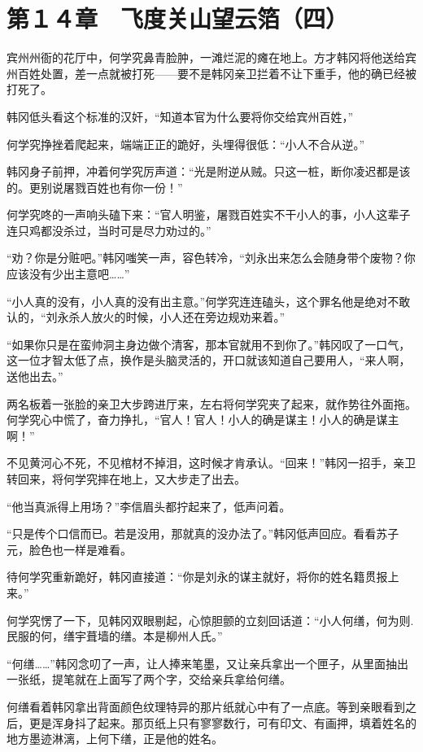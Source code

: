 \section{第１４章　飞度关山望云箔（四）}

宾州州衙的花厅中，何学究鼻青脸肿，一滩烂泥的瘫在地上。方才韩冈将他送给宾州百姓处置，差一点就被打死——要不是韩冈亲卫拦着不让下重手，他的确已经被打死了。

韩冈低头看这个标准的汉奸，“知道本官为什么要将你交给宾州百姓，”

何学究挣挫着爬起来，端端正正的跪好，头埋得很低：“小人不合从逆。”

韩冈身子前押，冲着何学究厉声道：“光是附逆从贼。只这一桩，断你凌迟都是该的。更别说屠戮百姓也有你一份！”

何学究咚的一声响头磕下来：“官人明鉴，屠戮百姓实不干小人的事，小人这辈子连只鸡都没杀过，当时可是尽力劝过的。”

“劝？你是分赃吧。”韩冈嗤笑一声，容色转冷，“刘永出来怎么会随身带个废物？你应该没有少出主意吧……”

“小人真的没有，小人真的没有出主意。”何学究连连磕头，这个罪名他是绝对不敢认的，“刘永杀人放火的时候，小人还在旁边规劝来着。”

“如果你只是在蛮帅洞主身边做个清客，那本官就用不到你了。”韩冈叹了一口气，这一位才智太低了点，换作是头脑灵活的，开口就该知道自己要用人，“来人啊，送他出去。”

两名板着一张脸的亲卫大步跨进厅来，左右将何学究夹了起来，就作势往外面拖。何学究心中慌了，奋力挣扎，“官人！官人！小人的确是谋主！小人的确是谋主啊！”

不见黄河心不死，不见棺材不掉泪，这时候才肯承认。“回来！”韩冈一招手，亲卫转回来，将何学究摔在地上，又大步走了出去。

“他当真派得上用场？”李信眉头都拧起来了，低声问着。

“只是传个口信而已。若是没用，那就真的没办法了。”韩冈低声回应。看看苏子元，脸色也一样是难看。

待何学究重新跪好，韩冈直接道：“你是刘永的谋主就好，将你的姓名籍贯报上来。”

何学究愣了一下，见韩冈双眼剔起，心惊胆颤的立刻回话道：“小人何缮，何为则.民服的何，缮宇葺墙的缮。本是柳州人氏。”

“何缮……”韩冈念叨了一声，让人捧来笔墨，又让亲兵拿出一个匣子，从里面抽出一张纸，提笔就在上面写了两个字，交给亲兵拿给何缮。

何缮看着韩冈拿出背面颜色纹理特异的那片纸就心中有了一点底。等到亲眼看到之后，更是浑身抖了起来。那页纸上只有寥寥数行，可有印文、有画押，填着姓名的地方墨迹淋漓，上何下缮，正是他的姓名。

